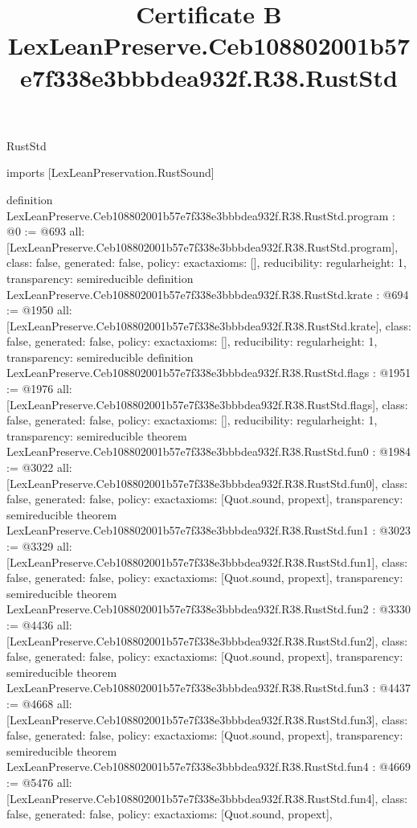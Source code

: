 \begin{lexlean}{RustStd}
\title{Certificate B LexLeanPreserve.Ceb108802001b57e7f338e3bbbdea932f.R38.RustStd}
\begin{coremodule}
imports [LexLeanPreservation.RustSound]

definition LexLeanPreserve.Ceb108802001b57e7f338e3bbbdea932f.R38.RustStd.program : @0 := @693 {
  all: [LexLeanPreserve.Ceb108802001b57e7f338e3bbbdea932f.R38.RustStd.program],
  class: false,
  generated: false,
  policy: exact{axioms: []},
  reducibility: regular{height: 1},
  transparency: semireducible
}
definition LexLeanPreserve.Ceb108802001b57e7f338e3bbbdea932f.R38.RustStd.krate : @694 := @1950 {
  all: [LexLeanPreserve.Ceb108802001b57e7f338e3bbbdea932f.R38.RustStd.krate],
  class: false,
  generated: false,
  policy: exact{axioms: []},
  reducibility: regular{height: 1},
  transparency: semireducible
}
definition LexLeanPreserve.Ceb108802001b57e7f338e3bbbdea932f.R38.RustStd.flags : @1951 := @1976 {
  all: [LexLeanPreserve.Ceb108802001b57e7f338e3bbbdea932f.R38.RustStd.flags],
  class: false,
  generated: false,
  policy: exact{axioms: []},
  reducibility: regular{height: 1},
  transparency: semireducible
}
theorem LexLeanPreserve.Ceb108802001b57e7f338e3bbbdea932f.R38.RustStd.fun0 : @1984 := @3022 {
  all: [LexLeanPreserve.Ceb108802001b57e7f338e3bbbdea932f.R38.RustStd.fun0],
  class: false,
  generated: false,
  policy: exact{axioms: [Quot.sound, propext]},
  transparency: semireducible
}
theorem LexLeanPreserve.Ceb108802001b57e7f338e3bbbdea932f.R38.RustStd.fun1 : @3023 := @3329 {
  all: [LexLeanPreserve.Ceb108802001b57e7f338e3bbbdea932f.R38.RustStd.fun1],
  class: false,
  generated: false,
  policy: exact{axioms: [Quot.sound, propext]},
  transparency: semireducible
}
theorem LexLeanPreserve.Ceb108802001b57e7f338e3bbbdea932f.R38.RustStd.fun2 : @3330 := @4436 {
  all: [LexLeanPreserve.Ceb108802001b57e7f338e3bbbdea932f.R38.RustStd.fun2],
  class: false,
  generated: false,
  policy: exact{axioms: [Quot.sound, propext]},
  transparency: semireducible
}
theorem LexLeanPreserve.Ceb108802001b57e7f338e3bbbdea932f.R38.RustStd.fun3 : @4437 := @4668 {
  all: [LexLeanPreserve.Ceb108802001b57e7f338e3bbbdea932f.R38.RustStd.fun3],
  class: false,
  generated: false,
  policy: exact{axioms: [Quot.sound, propext]},
  transparency: semireducible
}
theorem LexLeanPreserve.Ceb108802001b57e7f338e3bbbdea932f.R38.RustStd.fun4 : @4669 := @5476 {
  all: [LexLeanPreserve.Ceb108802001b57e7f338e3bbbdea932f.R38.RustStd.fun4],
  class: false,
  generated: false,
  policy: exact{axioms: [Quot.sound, propext]},
}
\end{coremodule}
\end{lexlean}
